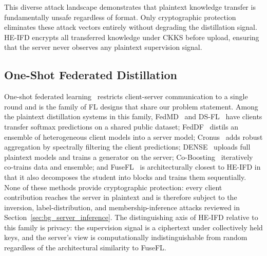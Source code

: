 
This diverse attack landscape demonstrates that plaintext knowledge transfer is fundamentally unsafe regardless of format. Only cryptographic protection eliminates these attack vectors entirely without degrading the distillation signal. HE-IFD encrypts all transferred knowledge under CKKS before upload, ensuring that the server never observes any plaintext supervision signal.



\subsection{One-Shot Federated Distillation}
\label{sec:bg_oneshot}

One-shot federated learning~\cite{guha2019oneshot, wang2025towards} restricts client-server communication to a single round and is the family of FL designs that share our problem statement. Among the plaintext distillation systems in this family, FedMD~\cite{li2019fedmd} and DS-FL~\cite{itahara2021dsfl} have clients transfer softmax predictions on a shared public dataset; FedDF~\cite{lin2020feddf} distils an ensemble of heterogeneous client models into a server model; Cronus~\cite{chang2019cronus} adds robust aggregation by spectrally filtering the client predictions; DENSE~\cite{zhang2022dense} uploads full plaintext models and trains a generator on the server; Co-Boosting~\cite{dai2024coboosting} iteratively co-trains data and ensemble; and FuseFL~\cite{tang2024fusefl} is architecturally closest to HE-IFD in that it also decomposes the student into blocks and trains them sequentially. None of these methods provide cryptographic protection: every client contribution reaches the server in plaintext and is therefore subject to the inversion, label-distribution, and membership-inference attacks reviewed in Section~\ref{sec:bg_server_inference}. The distinguishing axis of HE-IFD relative to this family is privacy: the supervision signal is a ciphertext under collectively held keys, and the server's view is computationally indistinguishable from random regardless of the architectural similarity to FuseFL.

